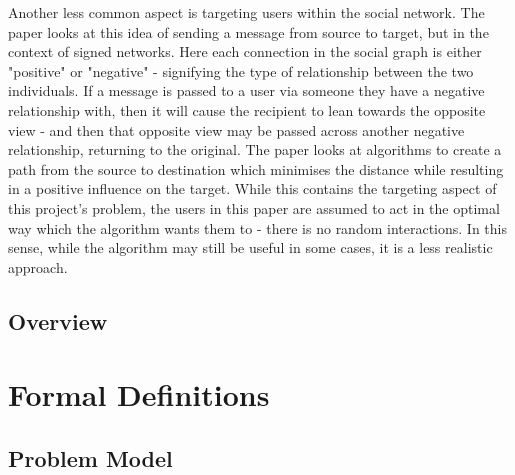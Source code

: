 \documentclass[bsc,frontabs,twoside,singlespacing,parskip,deptreport]{infthesis}     %
\begin{document}
Another less common aspect is targeting users within the social network. The paper \cite{TargetedSignedNetworks} looks at this idea of sending a message from source to target, but in the context of signed networks. Here each connection in the social graph is either "positive" or "negative" - signifying the type of relationship between the two individuals. If a message is passed to a user via someone they have a negative relationship with, then it will cause the recipient to lean towards the opposite view - and then that opposite view may be passed across another negative relationship, returning to the original. The paper looks at algorithms to create a path from the source to destination which minimises the distance while resulting in a positive influence on the target. While this contains the targeting aspect of this project's problem, the users in this paper are assumed to act in the optimal way which the algorithm wants them to - there is no random interactions. In this sense, while the algorithm may still be useful in some cases, it is a less realistic approach.

\section{Overview}
%
%



\chapter{Formal Definitions}
\section{Problem Model}
\end{document}
